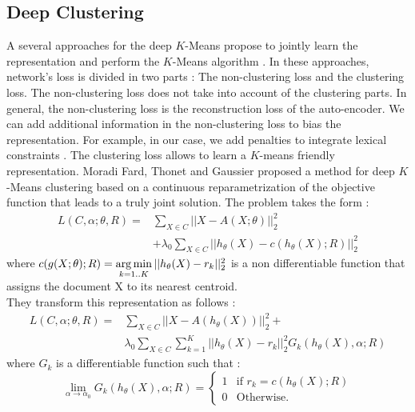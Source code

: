\subsection{\label{seq:DeepClust}Deep Clustering}
A several approaches for the deep $K$-Means propose to jointly learn the
representation and perform the $K$-Means algorithm \cite{2018arXiv180107648A}.
In these approaches, network's loss is divided in two parts :
The non-clustering loss and the clustering loss.
The non-clustering loss does not
take into account of the clustering parts. In general, the non-clustering 
loss is the reconstruction loss of the auto-encoder. We can add additional 
information in the non-clustering loss to bias the representation. For
example, in our case, we add penalties to integrate lexical constraints
.
The clustering loss allows to learn a  $K$-means friendly representation.
Moradi Fard, Thonet and Gaussier \cite{Deap-K-Means} proposed a method for deep $K$-Means 
clustering based on a continuous reparametrization of the objective function 
that leads to a truly joint solution. 
The problem takes the form : 
\begin{equation}
\begin{array}{ll}
L(C ,\alpha;\theta,R) = & \sum\limits_{X \in C} ||X - A(X;\theta)||_2^2 \\
  & + \lambda_0 \sum\limits_{X \in C}||h_\theta(X) - c(h_\theta(X); R) ||_2^2
\end{array}
\end{equation}
where $c(g(X; \theta); R) = \operatorname*{arg\,min}\limits_{k = 1 .. K} || h_\theta(X) - r_k||_2^2$
is a non differentiable function that assigns the document X
to its nearest centroid.\\
They transform this representation as follows :
\begin{equation}
\begin{array}{ll}
L(C ,\alpha;\theta,R) = & \sum\limits_{X \in C} ||X - A(h_\theta(X))||_2^2 + \\ 
& \lambda_0 \sum\limits_{X \in C}\sum\limits_{k=1}^K||h_\theta(X) - r_k ||_2^2 G_{k}(h_\theta(X), \alpha; R) 
\end{array}
\end{equation}
where $G_{k}$ is a differentiable function such that :
\begin{equation}
  \lim\limits_{\alpha \rightarrow \alpha_0}G_{k}(h_\theta(X), \alpha; R) = \left\{
\begin{array}{ll}
  1 & \mbox{if } r_k = c(h_\theta(X); R)\\
  0 & \mbox{Otherwise.}
\end{array}
\right.
\end{equation}
